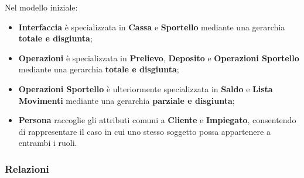 Nel modello iniziale:
\begin{itemize}
  \item \textbf{Interfaccia} è specializzata in \textbf{Cassa} e \textbf{Sportello} mediante una gerarchia \textbf{totale e disgiunta};
  \item \textbf{Operazioni} è specializzata in \textbf{Prelievo}, \textbf{Deposito} e \textbf{Operazioni Sportello} mediante una gerarchia \textbf{totale e disgiunta};
  \item \textbf{Operazioni Sportello} è ulteriormente specializzata in \textbf{Saldo} e \textbf{Lista Movimenti} mediante una gerarchia \textbf{parziale e disgiunta};
  \item \textbf{Persona} raccoglie gli attributi comuni a \textbf{Cliente} e \textbf{Impiegato}, consentendo di rappresentare il caso in cui uno stesso soggetto possa appartenere a entrambi i ruoli.
\end{itemize}

\subsubsection{Relazioni}

